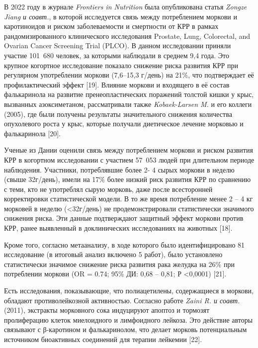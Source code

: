\begin{multicols}{2}

В 2022 году в журнале \emph{Frontiers in Nutrition} была опубликована
статья \emph{Zongze Jiang и соавт.}, в которой исследуется связь между
потреблением моркови и каротиноидов и риском заболеваемости и смертности
от КРР в рамках рандомизированного клинического исследования Prostate,
Lung, Colorectal, and Ovarian Cancer Screening Trial (PLCO). В данном
исследовании приняли участие 101~680 человек, за которыми наблюдали в
среднем 9,4 года. Это крупное когортное исследование показало снижение
риска развития КРР при регулярном употреблении моркови (7,6--15,3
г/день) на 21\%, что подтверждает её профилактический эффект {[}19{]}.
Влияние моркови и входящего в её состав фалькаринола на развитие
пренеопластических поражений толстой кишки у крыс, вызванных
азоксиметаном, рассматривали также \emph{Kobaek-Larsen M.} и его коллеги
(2005), где были получены результаты значительного снижения количества
опухолевого роста у крыс, которые получали диетическое лечение морковью
и фалькаринола {[}20{]}.

Ученые из Дании оценили связь между потреблением моркови и риском
развития КРР в когортном исследовании с участием 57~053 людей при
длительном периоде наблюдения. Участники, потреблявшие более 2- 4 сырых
моркови в неделю (свыше 32г/день), имели на 17\% более низкий риск
развития КРР по сравнению с теми, кто не употреблял сырую морковь, даже
после всесторонней корректировки статистической модели. В то же время
потребление менее 2 -- 4 кг морковей в неделю (\textless32г/день) не
продемонстрировали статистически значимого снижения риска. Эти данные
подтверждают защитный эффект моркови против КРР, ранее выявленный в
доклинических исследованиях на животных {[}18{]}.

Кроме того, согласно метаанализу, в ходе которого было идентифицировано
81 исследование (в итоговый анализ включено 5 работ), было установлено
статистически значимое снижение риска развития рака желудка на 26\% при
потреблении моркови (OR = 0.74; 95\% ДИ: 0,68 -- 0,81; Р
\textless0,0001) {[}21{]}.

Есть исследования, показывающие, что полиацетилены, содержащиеся в
моркови, обладают противолейкозной активностью. Согласно работе
\emph{Zaini R. и соавт.} (2011), экстракты морковного сока индуцируют
апоптоз и тормозят пролиферацию клеток миелоидного и лимфоидного
лейкоза. Это действие авторы связывают с β-каротином и фалькаринолом,
что делает морковь потенциальным источником биоактивных соединений для
терапии лейкемии {[}22{]}.


\end{multicols}
